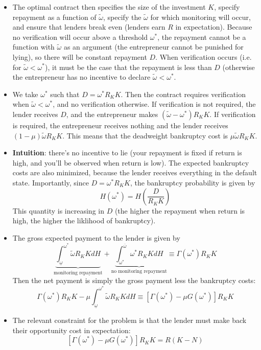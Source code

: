 \documentclass[12pt]{article}
\begin{document}
\begin{itemize}
    \item The optimal contract then specifies the size of the investment $K$, specify repayment as a function of $\widetilde{\omega}$, specify the $\widetilde{\omega}$ for which monitoring will occur, and ensure that lenders break even (lenders earn $R$ in expectation). Because no verification will occur above a threshold $\omega^*$, the repayment cannot be a function with $\widetilde{\omega}$ as an argument (the entrepreneur cannot be punished for lying), so there will be constant repayment $D$. When verification occurs (i.e. for $\widetilde{\omega} < \omega^*$), it must be the case that the repayment is less than $D$ (otherwise the entrepreneur has no incentive to declare $\widetilde{\omega} < \omega^*$.
    \item We take $\omega^*$ such that $D = \omega^*R_KK$. Then the contract requires verification when $\widetilde{\omega} < \omega^*$, and no verification otherwise. If verification is not required, the lender receives $D$, and the entrepreneur makes $(\widetilde{\omega} - \omega^*)R_KK$. If verification is required, the entrepreneur receives nothing and the lender receives $(1-\mu)\widetilde{\omega}R_KK$. This means that the deadweight bankruptcy cost is $\mu\widetilde{\omega}R_KK$. 
    \item \textbf{Intuition}: there's no incentive to lie (your repayment is fixed if return is high, and you'll be observed when return is low). The expected bankruptcy costs are also minimized, because the lender receives everything in the default state. Importantly, since $D = \omega^*R_KK$, the bankruptcy probability is given by
    \[H(\omega^*) = H\left(\frac{D}{R_KK}\right)\]
    This quantity is increasing in $D$ (the higher the repayment when return is high, the higher the liklihood of bankruptcy). 
    \item The gross expected payment to the lender is given by
    \[\underbrace{\int_{\underline{\omega}}^{\omega^*}\widetilde{\omega}R_KKdH}_{\text{monitoring repayment}} + \underbrace{\int_{\omega^*}^{\overline{\omega}}\omega^*R_KKdH}_{\text{no monitoring repayment}} \equiv \Gamma(\omega^*)R_KK\]
    Then the net payment is simply the gross payment less the bankruptcy costs:
    \[\Gamma(\omega^*)R_KK - \mu \int_{\underline{\omega}}^{\omega^*}\widetilde{\omega}R_KKdH \equiv \left[\Gamma(\omega^*) - \mu G(\omega^*)\right]R_KK\]
    \item The relevant constraint for the problem is that the lender must make back their opportunity cost in expectation:
    \[\left[\Gamma(\omega^*) - \mu G(\omega^*)\right]R_KK = R(K-N)\]

\end{itemize}
\end{document}
